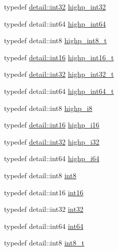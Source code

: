 \begin{DoxyCompactItemize}
typedef \hyperlink{stb__image_8c_a43d43196463bde49cb067f5c20ab8481}{detail\+::int32} \hyperlink{group__gtc__type__precision_gaa2045c92b9553d463191af6a20e997bb}{highp\+\_\+int32}
\item 
typedef detail\+::int64 \hyperlink{group__gtc__type__precision_ga7ffb27943e9569800979081bc548621c}{highp\+\_\+int64}
\item 
typedef detail\+::int8 \hyperlink{group__gtc__type__precision_ga417701b99e6e7992f35ab2ef694f88b2}{highp\+\_\+int8\+\_\+t}
\item 
typedef \hyperlink{stb__image_8c_a259fa4834387bd68627ddf37bb3ebdb9}{detail\+::int16} \hyperlink{group__gtc__type__precision_ga07d318d61472e75238e53b9642227672}{highp\+\_\+int16\+\_\+t}
\item 
typedef \hyperlink{stb__image_8c_a43d43196463bde49cb067f5c20ab8481}{detail\+::int32} \hyperlink{group__gtc__type__precision_ga783d077a513c1f475f6cdb406b4238c3}{highp\+\_\+int32\+\_\+t}
\item 
typedef detail\+::int64 \hyperlink{group__gtc__type__precision_ga0f5186bde44471133b08057cae8a51ac}{highp\+\_\+int64\+\_\+t}
\item 
typedef detail\+::int8 \hyperlink{group__gtc__type__precision_ga8b9eb0b24cce7f14478bfcacb53ce839}{highp\+\_\+i8}
\item 
typedef \hyperlink{stb__image_8c_a259fa4834387bd68627ddf37bb3ebdb9}{detail\+::int16} \hyperlink{group__gtc__type__precision_gaa04399853952dbce29cb62e2432f350a}{highp\+\_\+i16}
\item 
typedef \hyperlink{stb__image_8c_a43d43196463bde49cb067f5c20ab8481}{detail\+::int32} \hyperlink{group__gtc__type__precision_ga197d19b585222da57d70238a5cfc2be8}{highp\+\_\+i32}
\item 
typedef detail\+::int64 \hyperlink{group__gtc__type__precision_gad3cb9a0ac0266ea2c51c6fac256345d1}{highp\+\_\+i64}
\item 
typedef detail\+::int8 \hyperlink{group__gtc__type__precision_ga96254f9c1c4506fc8eb5cf3301ce8565}{int8}
\item 
typedef detail\+::int16 \hyperlink{group__gtc__type__precision_ga2945a61d12771f8954994fcddf02b021}{int16}
\item 
typedef detail\+::int32 \hyperlink{group__gtc__type__precision_ga632d8b25f6b61659f39ea4321fab92a4}{int32}
\item 
typedef detail\+::int64 \hyperlink{group__gtc__type__precision_ga435d75819cce297cc5fa21bd84ef89a5}{int64}
\item 
typedef detail\+::int8 \hyperlink{group__gtc__type__precision_ga673898d450b2a91186f3c4f40c5f8633}{int8\+\_\+t}

\end{DoxyCompactItemize}

